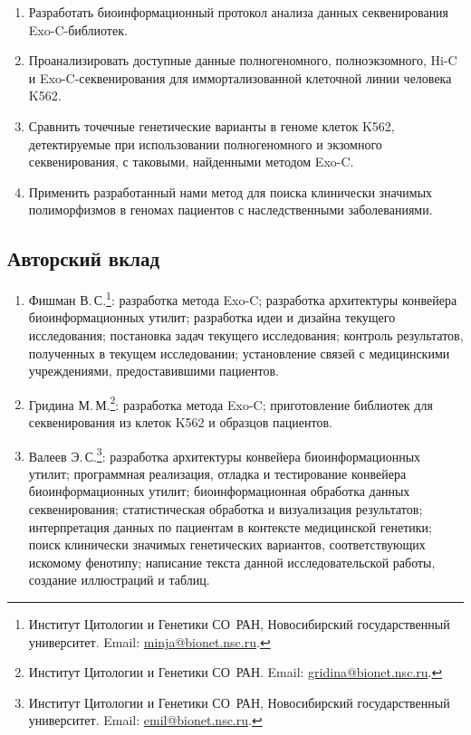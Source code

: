 \documentclass[a4paper,14pt]{extarticle}
\begin{document}
\begin{enumerate}
	\item Разработать биоинформационный протокол анализа данных секвенирования Exo-C\hyp{}библиотек.
	\item Проанализировать доступные данные полногеномного, полноэкзомного, Hi-C и Exo-C\hyp{}секвенирования для иммортализованной клеточной линии человека K562.
	\item Сравнить точечные генетические варианты в геноме клеток K562, детектируемые при использовании полногеномного и экзомного секвенирования, с таковыми, найденными методом Exo-C.
	\item Применить разработанный нами метод ​для поиска клинически значимых полиморфизмов в геномах пациентов с наследственными заболеваниями.
\end{enumerate}

\subsection*{Авторский вклад}
\begin{enumerate}
\item Фишман В.\,С.\footnote{Институт Цитологии и Генетики СО~РАН, Новосибирский государственный университет. Email: \href{mailto:minja@bionet.nsc.ru}{minja@bionet.nsc.ru}.}:
разработка метода Exo-C;
разработка архитектуры конвейера биоинформационных утилит;
разработка идеи и дизайна текущего исследования;
постановка задач текущего исследования;
контроль результатов, полученных в текущем исследовании;
установление связей с медицинскими учреждениями, предоставившими пациентов.

\item Гридина М.\,М.\footnote{Институт Цитологии и Генетики СО~РАН. Email: \href{mailto:gridina@bionet.nsc.ru}{gridina@bionet.nsc.ru}.}:
разработка метода Exo-C;
приготовление библиотек для секвенирования из клеток K562 и образцов пациентов.

\item Валеев Э.\,С.\footnote{Институт Цитологии и Генетики СО~РАН, Новосибирский государственный университет. Email: \href{mailto:emil@bionet.nsc.ru}{emil@bionet.nsc.ru}.}:
разработка архитектуры конвейера биоинформационных утилит;
программная реализация, отладка и тестирование конвейера биоинформационных утилит;
биоинформационная обработка данных секвенирования;
статистическая обработка и визуализация результатов;
интерпретация данных по пациентам в контексте медицинской генетики;
поиск клинически значимых генетических вариантов, соответствующих искомому фенотипу;
написание текста данной исследовательской работы, создание иллюстраций и таблиц.
\end{enumerate}
\end{document}
